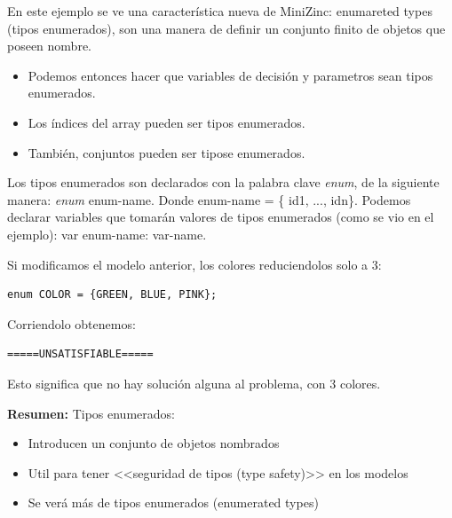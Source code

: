 \documentclass[12pt]{article}
\begin{document}
\begin{justify}
En este ejemplo se ve una característica nueva de MiniZinc: enumareted types (tipos enumerados), son una manera de definir un conjunto finito de objetos que poseen nombre.
\end{justify}

\begin{itemize}
\item Podemos entonces hacer que variables de decisión y parametros sean tipos enumerados. 
\item Los índices del array pueden ser tipos enumerados.
\item También, conjuntos pueden ser tipose enumerados.
\end{itemize}

\begin{justify}
Los tipos enumerados son declarados con la palabra clave \textit{enum}, de la siguiente manera: \textit{enum} enum-name. Donde enum-name = \{ id1, ..., idn\}. Podemos declarar variables que tomarán valores de tipos enumerados (como se vio en el ejemplo): var enum-name: var-name.
\end{justify}

\begin{justify}
Si modificamos el modelo anterior, los colores reduciendolos solo a 3:
\end{justify}

\begin{Verbatim}
enum COLOR = {GREEN, BLUE, PINK};
\end{Verbatim}

\begin{justify}
Corriendolo obtenemos:
\end{justify}


\begin{Verbatim}
=====UNSATISFIABLE=====
\end{Verbatim}

\begin{justify}
Esto significa que no hay solución alguna al problema, con 3 colores.
\end{justify}

\begin{justify}
\textbf{Resumen:} Tipos enumerados:
\end{justify}

\begin{itemize}
\item Introducen un conjunto de objetos nombrados
\item Util para tener <<seguridad de tipos (type safety)>> en los modelos
\item Se verá más de tipos enumerados (enumerated types)
\end{itemize}
\end{document}
